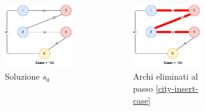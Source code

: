 \documentclass[9pt]{beamer}
\begin{document}
\begin{frame}{\subsecname}
{      \begin{columns}[T,onlytextwidth]
		\begin{figure}[h]
		\centering
		\includegraphics[height=0.25\textheight]
		{../images/graph-greedy-request-order-solution-tsppd-with-two-customers}	
		\caption{Soluzione $s_0$}
		\end{figure}
		\begin{figure}[h]
		\centering
		\includegraphics[height=0.25\textheight]
		{../images/city-swap}	
		\caption{Archi eliminati al passo \ref{city-insert-case}}
		\end{figure}
		\begin{figure}[h]
		\centering

\end{figure}
\end{columns}}
\end{frame}
\end{document}
